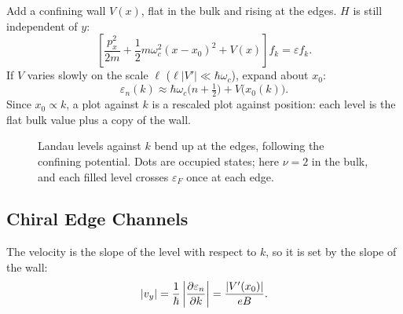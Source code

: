 Add a confining wall $V(x)$, flat in the bulk and rising at the edges. $H$ is still independent of $y$:
\begin{equation}
    \left[\frac{p_x^2}{2m} + \frac12m\omega_c^2(x-x_0)^2 + V(x)\right]f_k = \varepsilon f_k.
\end{equation}
If $V$ varies slowly on the scale $\ell$ ($\ell|V'|\ll\hbar\omega_c$), expand about $x_0$:
\begin{equation}
    \varepsilon_n(k) \approx \hbar\omega_c\bigl(n+\tfrac12\bigr) + V\bigl(x_0(k)\bigr).
\end{equation}
Since $x_0\propto k$, a plot against $k$ is a rescaled plot against position: each level is the flat bulk value plus a copy of the wall.

\begin{figure}[ht]
\centering
{}
\caption{Landau levels against $k$ bend up at the edges, following the confining potential. Dots are occupied states; here $\nu = 2$ in the bulk, and each filled level crosses $\varepsilon_F$ once at each edge.}
\label{fig:qhe-edge-levels}
\end{figure}

\subsection{Chiral Edge Channels}

The velocity is the slope of the level with respect to $k$, so it is set by the slope of the wall:
\begin{equation}
    |v_y| = \frac1\hbar\left|\pdv{\varepsilon_n}{k}\right| = \frac{|V'(x_0)|}{eB}.
\end{equation}

